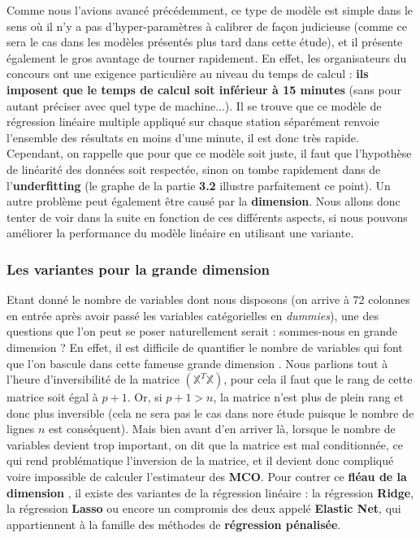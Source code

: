 \documentclass[14pt, openany]{article}
\begin{document}
Comme nous l'avions avancé précédemment, ce type de modèle est \og simple \fg{} dans le sens où il n'y a pas d'hyper-paramètres à calibrer de façon judicieuse (comme ce sera le cas dans les modèles présentés plus tard dans cette étude), et il présente également le gros avantage de tourner rapidement. En effet, les organisateurs du concours ont une exigence particulière au niveau du temps de calcul : \textbf{ils imposent que le temps de calcul soit inférieur à 15 minutes} (sans pour autant préciser avec quel type de machine...). Il se trouve que ce modèle de régression linéaire multiple appliqué sur chaque station séparément renvoie l'ensemble des résultats en moins d'une minute, il est donc très rapide. Cependant, on rappelle que pour que ce modèle soit juste, il faut que l'hypothèse de linéarité des données soit respectée, sinon on tombe rapidement dans de l'\textbf{underfitting} (le graphe de la partie \textbf{3.2} illustre parfaitement ce point). Un autre problème peut également être causé par la \textbf{dimension}. Nous allons donc tenter de voir dans la suite en fonction de ces différents aspects, si nous pouvons améliorer la performance du modèle linéaire en utilisant une variante.
\subsubsection{Les variantes pour la grande dimension}
Etant donné le nombre de variables dont nous disposons (on arrive à 72 colonnes en entrée après avoir passé les variables catégorielles en \textit{dummies}), une des questions que l'on peut se poser naturellement serait : sommes-nous en grande dimension ? En effet, il est difficile de quantifier le nombre de variables qui font que l'on bascule dans cette fameuse \og grande dimension \fg{}. Nous parlions tout à l'heure d'inversibilité de la matrice $(\mathbb{X}^T\mathbb{X})$, pour cela il faut que le rang de cette matrice soit égal à $p+1$. Or, si $p+1 > n$, la matrice n'est plus de plein rang et donc plus inversible (cela ne sera pas le cas dans nore étude puisque le nombre de lignes $n$ est conséquent). Mais bien avant d'en arriver là, lorsque le nombre de variables devient trop important, on dit que la matrice est mal conditionnée, ce qui rend problématique l'inversion de la matrice, et il devient donc compliqué voire impossible de calculer l'estimateur des \textbf{MCO}. Pour contrer ce \og \textbf{fléau de la dimension} \fg{}, il existe des variantes de la régression linéaire : la régression \textbf{Ridge}, la régression \textbf{Lasso} ou encore un compromis des deux appelé \textbf{Elastic Net}, qui appartiennent à la famille des méthodes de \textbf{régression pénalisée}.
\end{document}
